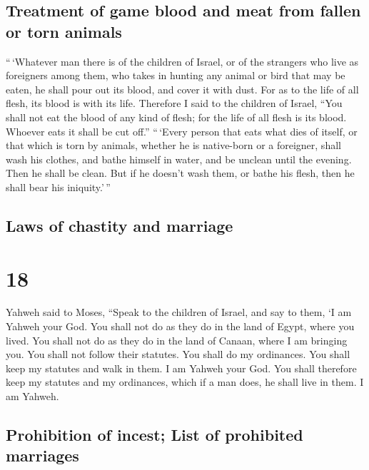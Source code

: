 \hypertarget{treatment-of-game-blood-and-meat-from-fallen-or-torn-animals}{%
\subsection{Treatment of game blood and meat from fallen or torn
animals}\label{treatment-of-game-blood-and-meat-from-fallen-or-torn-animals}}

 ``\,`Whatever man there is of the children of Israel, or
of the strangers who live as foreigners among them, who takes in hunting
any animal or bird that may be eaten, he shall pour out its blood, and
cover it with dust.  For as to the life of all flesh, its
blood is with its life. Therefore I said to the children of Israel,
``You shall not eat the blood of any kind of flesh; for the life of all
flesh is its blood. Whoever eats it shall be cut off.'' 
``\,`Every person that eats what dies of itself, or that which is torn
by animals, whether he is native-born or a foreigner, shall wash his
clothes, and bathe himself in water, and be unclean until the evening.
Then he shall be clean.  But if he doesn't wash them, or
bathe his flesh, then he shall bear his iniquity.'\,''

\hypertarget{laws-of-chastity-and-marriage}{%
\subsection{Laws of chastity and
marriage}\label{laws-of-chastity-and-marriage}}

\hypertarget{section-17}{%
\section{18}\label{section-17}}

 Yahweh said to Moses,  ``Speak to the
children of Israel, and say to them, `I am Yahweh your God.
 You shall not do as they do in the land of Egypt, where
you lived. You shall not do as they do in the land of Canaan, where I am
bringing you. You shall not follow their statutes.  You
shall do my ordinances. You shall keep my statutes and walk in them. I
am Yahweh your God.  You shall therefore keep my statutes
and my ordinances, which if a man does, he shall live in them. I am
Yahweh.

\hypertarget{prohibition-of-incest-list-of-prohibited-marriages}{%
\subsection{Prohibition of incest; List of prohibited
marriages}\label{prohibition-of-incest-list-of-prohibited-marriages}}

